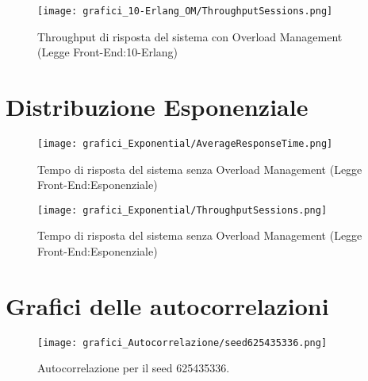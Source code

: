 \begin{figure}[H]
	\begin{center}
	\texttt{[image: grafici\_10-Erlang\_OM/ThroughputSessions.png]}
	\caption[Throughput di risposta del sistema con Overload Management (Legge Front-End:10-Erlang)]
	{Throughput di risposta del sistema con Overload Management (Legge Front-End:10-Erlang)}
	\label{fig:exp_res_time}
	\end{center}
	\end{figure}

\section{Distribuzione Esponenziale}

\begin{figure}[H]
\begin{center}
	
	\texttt{[image: grafici\_Exponential/AverageResponseTime.png]}
	\caption[Tempo di risposta del sistema senza Overload Management (Legge Front-End:Esponenziale)]
	{Tempo di risposta del sistema senza Overload Management (Legge Front-End:Esponenziale)}
	\label{fig:exp_res_time}
	\end{center}
	\end{figure}
	
\begin{figure}[H]
	
\begin{center}
	\texttt{[image: grafici\_Exponential/ThroughputSessions.png]}
	\caption[Throughput del sistema senza Overload Management (Legge Front-End:Esponenziale)]
	{Tempo di risposta del sistema senza Overload Management (Legge Front-End:Esponenziale)}
	\label{fig:exp_res_time}
	\end{center}
	\end{figure}

\section{Grafici delle autocorrelazioni}
\begin{figure}[H]
	\begin{center}
	\texttt{[image: grafici\_Autocorrelazione/seed625435336.png]}
	\caption[Autocorrelazione per il seed 625435336]{Autocorrelazione per il seed 625435336.}
	\label{fig:exp_res_time}
	\end{center}
\end{figure}

